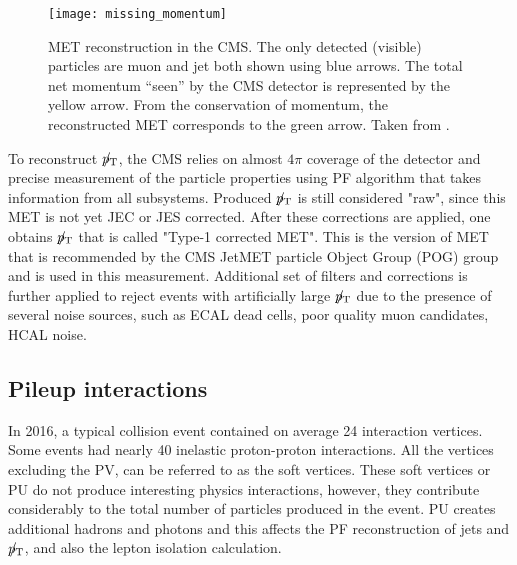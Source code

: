 \begin{figure}[H]
  \centering
  \texttt{[image: missing\_momentum]}
  \caption[MET reconstruction in the CMS.]{MET reconstruction in the CMS. The only detected (visible) particles are muon and jet both shown using blue arrows. The total net momentum ``seen'' by the CMS detector is represented by the yellow arrow. From the conservation of momentum, the reconstructed MET corresponds to the green arrow. Taken from \cite{missing_momentum}. }
  \label{missing_momentum}
\end{figure}





To reconstruct ${p}_\mathrm{T}\hspace{-1.02em}/\kern 0.5em$, the CMS relies on almost $4 \pi$ coverage of the detector and precise measurement of the particle properties using PF algorithm that takes information from all subsystems. Produced ${p}_\mathrm{T}\hspace{-1.02em}/\kern 0.5em$ is still considered "raw", since this MET is not yet JEC or JES corrected. After these corrections are applied, one obtains  ${p}_\mathrm{T}\hspace{-1.02em}/\kern 0.5em$ that is called "Type-1 corrected MET". This is the version of MET that is recommended by the CMS JetMET particle Object Group (POG) group and is used in this measurement. Additional set of filters and corrections is further applied to reject events with artificially large ${p}_\mathrm{T}\hspace{-1.02em}/\kern 0.5em$ due to the presence of several noise sources, such as ECAL dead cells, poor quality muon candidates, HCAL noise. 

\subsection{Pileup interactions}\label{sec:pileup}

In 2016, a typical collision event contained on average 24 interaction vertices. Some events had nearly 40 inelastic proton-proton interactions. All the vertices excluding the PV, can be referred to as the soft vertices. These soft vertices or PU do not produce interesting physics interactions, however, they contribute considerably to the total number of particles produced in the event. PU creates additional hadrons and photons and this affects the PF reconstruction of jets and ${p}_\mathrm{T}\hspace{-1.02em}/\kern 0.5em$, and also the lepton isolation calculation.

